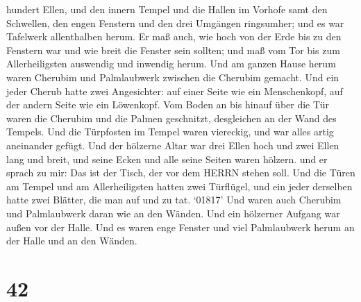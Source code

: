 hundert Ellen, und den innern Tempel und die Hallen im Vorhofe
 samt den Schwellen, den engen Fenstern und den drei
Umgängen ringsumher; und es war Tafelwerk allenthalben herum.
 Er maß auch, wie hoch von der Erde bis zu den Fenstern war
und wie breit die Fenster sein sollten; und maß vom Tor bis zum
Allerheiligsten auswendig und inwendig herum.  Und am
ganzen Hause herum waren Cherubim und Palmlaubwerk zwischen die Cherubim
gemacht.  Und ein jeder Cherub hatte zwei Angesichter: auf
einer Seite wie ein Menschenkopf, auf der andern Seite wie ein
Löwenkopf.  Vom Boden an bis hinauf über die Tür waren die
Cherubim und die Palmen geschnitzt, desgleichen an der Wand des Tempels.
 Und die Türpfosten im Tempel waren viereckig, und war
alles artig aneinander gefügt.  Und der hölzerne Altar war
drei Ellen hoch und zwei Ellen lang und breit, und seine Ecken und alle
seine Seiten waren hölzern. und er sprach zu mir: Das ist der Tisch, der
vor dem HERRN stehen soll.  Und die Türen am Tempel und am
Allerheiligsten  hatten zwei Türflügel, und ein jeder
derselben hatte zwei Blätter, die man auf und zu tat. 
`01817' Und waren auch Cherubim und Palmlaubwerk daran wie an den
Wänden. Und ein hölzerner Aufgang war außen vor der Halle. 
Und es waren enge Fenster und viel Palmlaubwerk herum an der Halle und
an den Wänden.

\hypertarget{section-41}{%
\section{42}\label{section-41}}

